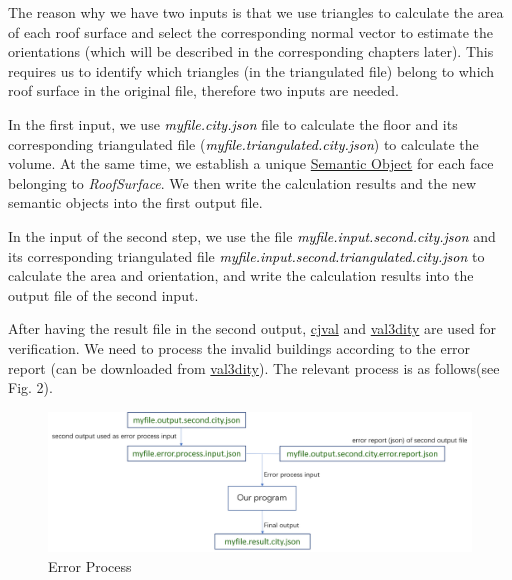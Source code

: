 \documentclass[12pt]{article}
\begin{document}
The reason why we have two inputs is that we use triangles to calculate the area of each roof surface and select the corresponding normal vector to estimate the orientations (which will be described in the corresponding chapters later). This requires us to identify which triangles (in the triangulated file) belong to which roof surface in the original file, therefore two inputs are needed.

In the first input, we use \textcolor{black}{\textit{myfile.city.json}} file to calculate the floor and its corresponding triangulated file (\textcolor{black}{\textit{myfile.triangulated.city.json}}) to calculate the volume. At the same time, we establish a unique \href{https://www.cityjson.org/specs/1.1.1/#semantics-of-geometric-primitives}{Semantic Object} for each face belonging to \textit{RoofSurface}. We then write the calculation results and the new semantic objects into the first output file.

In the input of the second step, we use the file \textcolor{black}{\textit{myfile.input.second.city.json}} and its corresponding triangulated file \textcolor{black}{\textit{myfile.input.second.triangulated.city.json}} to calculate the area and orientation, and write the calculation results into the output file of the second input.

After having the result file in the second output, \href{https://validator.cityjson.org/}{cjval} and \href{http://geovalidation.bk.tudelft.nl/val3dity/}{val3dity} are used for verification. We need to process the invalid buildings according to the error report (can be downloaded from \href{http://geovalidation.bk.tudelft.nl/val3dity/}{val3dity}). The relevant process is as follows(see Fig. 2).

\begin{figure}[ht] %
\centering
\includegraphics[width=16cm]{methodology-error process.png}
\caption{Error Process}
\end{figure}
\end{document}
